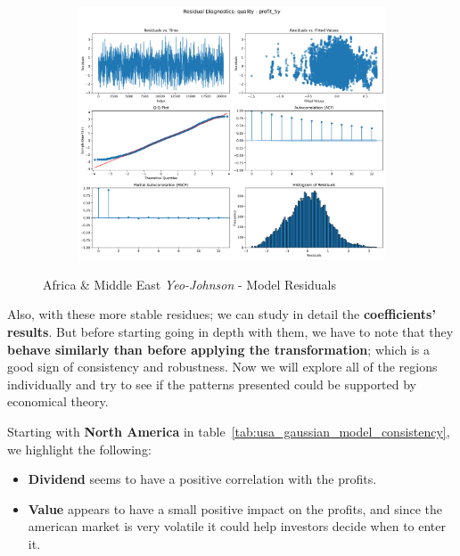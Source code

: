 \documentclass[11pt,english,a4paper,hidelinks]{book}
\begin{document}
\begin{figure}[H]
\begin{subfigure}[b]{0.32\textwidth}
    \end{subfigure}
    \hfill
    \begin{subfigure}[b]{0.32\textwidth}
        \centering
        \includegraphics[width=\textwidth]{images/code/models/linear_regression/first_model/AF/quality_profit_5y_residuals - Gaussian.png}
    \end{subfigure}
    \caption{Africa \& Middle East \textit{Yeo-Johnson} - Model Residuals}
    \label{fig:linear_regression_AF_residues_gaussian}
\end{figure}


\noindent Also, with these more stable residues; we can study in detail the \textbf{coefficients' results}. But before starting going in depth with them, we have to note that they \textbf{behave similarly than before applying the transformation}; which is a good sign of consistency and robustness. Now we will explore all of the regions individually and try to see if the patterns presented could be supported by economical theory.

\vspace{0.5cm}
\noindent Starting with \textbf{North America} in table~\ref{tab:usa_gaussian_model_consistency}, we highlight the following:
\begin{itemize}
    \item \textbf{Dividend} seems to have a positive correlation with the profits.
    \item \textbf{Value} appears to have a small positive impact on the profits, and since the american market is very volatile it could help investors decide when to enter it.
\end{itemize}
\end{document}
